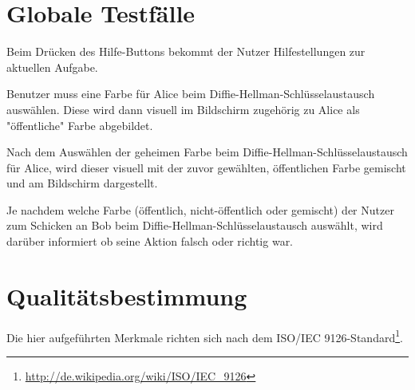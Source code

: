 \documentclass{article}
\begin{document}
\section{Globale Testfälle}
\begin{T}[start = 10]
\item Beim Drücken des Hilfe-Buttons bekommt der Nutzer Hilfestellungen zur aktuellen Aufgabe.
\end{T}

\begin{T}[start = 20]
 \item Benutzer muss eine Farbe für Alice beim Diffie-Hellman-Schlüsselaustausch auswählen. Diese wird dann visuell im Bildschirm zugehörig zu Alice als "öffentliche" Farbe abgebildet.
\end{T}

\begin{T}[start = 30]
 \item Nach dem Auswählen der geheimen Farbe beim Diffie-Hellman-Schlüsselaustausch für Alice, wird dieser visuell mit der zuvor gewählten, öffentlichen Farbe gemischt und am Bildschirm dargestellt.
\end{T}

\begin{T}[start = 40]
 \item Je nachdem welche Farbe (öffentlich, nicht-öffentlich oder gemischt) der Nutzer zum Schicken an Bob beim Diffie-Hellman-Schlüsselaustausch auswählt, wird darüber informiert ob seine Aktion falsch oder richtig war.
\end{T}

\section{Qualitätsbestimmung}

Die hier aufgeführten Merkmale richten sich nach dem ISO/IEC 9126-Standard\footnote{\url{http://de.wikipedia.org/wiki/ISO/IEC_9126}}.
\end{document}
